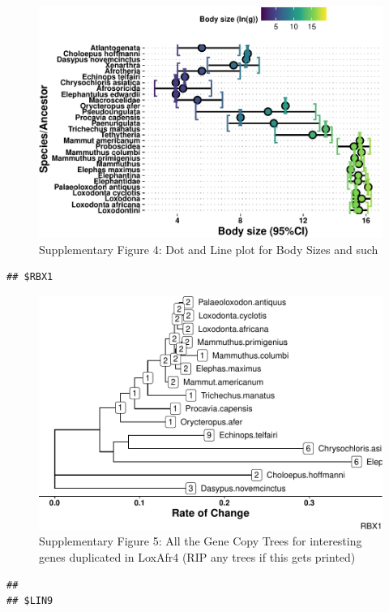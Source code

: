 \documentclass[10pt,letterpaper]{article}
\begin{document}
\begin{figure}
\centering
\includegraphics{paper_PLOS_draft_files/figure-latex/Supplementary Figure 4-1.pdf}
\caption{Supplementary Figure 4: Dot and Line plot for Body Sizes and
such}
\end{figure}

\begin{verbatim}
## $RBX1
\end{verbatim}

\begin{figure}
\centering
\includegraphics{paper_PLOS_draft_files/figure-latex/Supplementary Figure 5-1.pdf}
\caption{Supplementary Figure 5: All the Gene Copy Trees for interesting
genes duplicated in LoxAfr4 (RIP any trees if this gets printed)}
\end{figure}

\begin{verbatim}
## 
## $LIN9
\end{verbatim}
\end{document}
